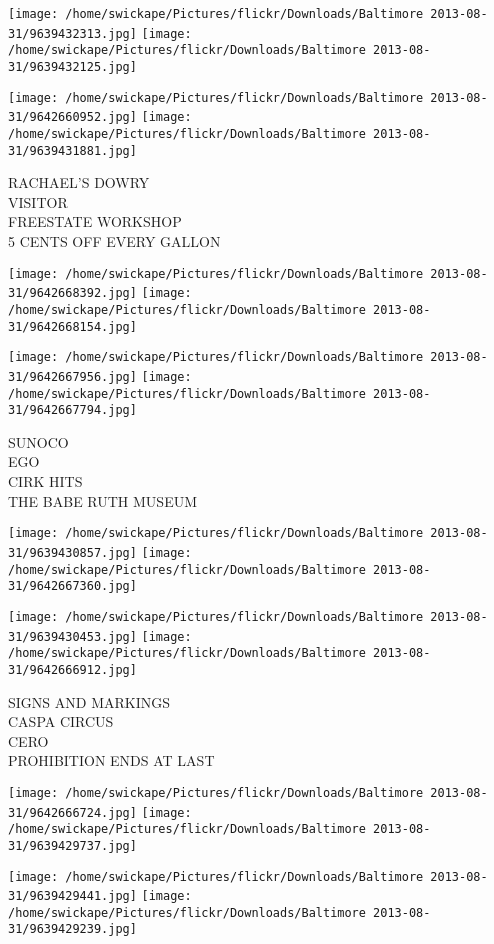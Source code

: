 \documentclass[10pt,letterpaper]{article}
\begin{document}
\texttt{[image: /home/swickape/Pictures/flickr/Downloads/Baltimore 2013-08-31/9639432313.jpg]}
\texttt{[image: /home/swickape/Pictures/flickr/Downloads/Baltimore 2013-08-31/9639432125.jpg]}

\texttt{[image: /home/swickape/Pictures/flickr/Downloads/Baltimore 2013-08-31/9642660952.jpg]}
\texttt{[image: /home/swickape/Pictures/flickr/Downloads/Baltimore 2013-08-31/9639431881.jpg]}

RACHAEL'S DOWRY\\
VISITOR\\
FREESTATE WORKSHOP\\
5 CENTS OFF EVERY GALLON
\pagebreak

\texttt{[image: /home/swickape/Pictures/flickr/Downloads/Baltimore 2013-08-31/9642668392.jpg]}
\texttt{[image: /home/swickape/Pictures/flickr/Downloads/Baltimore 2013-08-31/9642668154.jpg]}

\texttt{[image: /home/swickape/Pictures/flickr/Downloads/Baltimore 2013-08-31/9642667956.jpg]}
\texttt{[image: /home/swickape/Pictures/flickr/Downloads/Baltimore 2013-08-31/9642667794.jpg]}

SUNOCO\\
EGO\\
CIRK HITS\\
THE BABE RUTH MUSEUM
\pagebreak

\texttt{[image: /home/swickape/Pictures/flickr/Downloads/Baltimore 2013-08-31/9639430857.jpg]}
\texttt{[image: /home/swickape/Pictures/flickr/Downloads/Baltimore 2013-08-31/9642667360.jpg]}

\texttt{[image: /home/swickape/Pictures/flickr/Downloads/Baltimore 2013-08-31/9639430453.jpg]}
\texttt{[image: /home/swickape/Pictures/flickr/Downloads/Baltimore 2013-08-31/9642666912.jpg]}

SIGNS AND MARKINGS\\
CASPA CIRCUS\\
CERO\\
PROHIBITION ENDS AT LAST
\pagebreak

\texttt{[image: /home/swickape/Pictures/flickr/Downloads/Baltimore 2013-08-31/9642666724.jpg]}
\texttt{[image: /home/swickape/Pictures/flickr/Downloads/Baltimore 2013-08-31/9639429737.jpg]}

\texttt{[image: /home/swickape/Pictures/flickr/Downloads/Baltimore 2013-08-31/9639429441.jpg]}
\texttt{[image: /home/swickape/Pictures/flickr/Downloads/Baltimore 2013-08-31/9639429239.jpg]}
\end{document}
